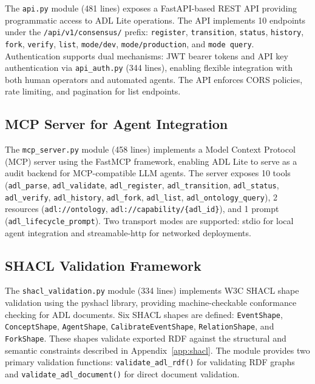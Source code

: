 The \texttt{api.py} module (481 lines) exposes a FastAPI-based REST API providing programmatic access to ADL Lite operations. The API implements 10 endpoints under the \texttt{/api/v1/consensus/} prefix: \texttt{register}, \texttt{transition}, \texttt{status}, \texttt{history}, \texttt{fork}, \texttt{verify}, \texttt{list}, \texttt{mode/dev}, \texttt{mode/production}, and \texttt{mode query}. Authentication supports dual mechanisms: JWT bearer tokens and API key authentication via \texttt{api\_auth.py} (344 lines), enabling flexible integration with both human operators and automated agents. The API enforces CORS policies, rate limiting, and pagination for list endpoints.

\subsection{MCP Server for Agent Integration}\label{app:mcp-server}

The \texttt{mcp\_server.py} module (458 lines) implements a Model Context Protocol (MCP) server using the FastMCP framework, enabling ADL Lite to serve as a audit backend for MCP-compatible LLM agents. The server exposes 10 tools (\texttt{adl\_parse}, \texttt{adl\_validate}, \texttt{adl\_register}, \texttt{adl\_transition}, \texttt{adl\_status}, \texttt{adl\_verify}, \texttt{adl\_history}, \texttt{adl\_fork}, \texttt{adl\_list}, \texttt{adl\_ontology\_query}), 2 resources (\texttt{adl://ontology}, \texttt{adl://capability/\{adl\_id\}}), and 1 prompt (\texttt{adl\_lifecycle\_prompt}). Two transport modes are supported: stdio for local agent integration and streamable-http for networked deployments.

\subsection{SHACL Validation Framework}\label{app:shacl-framework}

The \texttt{shacl\_validation.py} module (334 lines) implements W3C SHACL shape validation using the pyshacl library, providing machine-checkable conformance checking for ADL documents. Six SHACL shapes are defined: \texttt{EventShape}, \texttt{ConceptShape}, \texttt{AgentShape}, \texttt{CalibrateEventShape}, \texttt{RelationShape}, and \texttt{ForkShape}. These shapes validate exported RDF against the structural and semantic constraints described in Appendix~\ref{app:shacl}. The module provides two primary validation functions: \texttt{validate\_adl\_rdf()} for validating RDF graphs and \texttt{validate\_adl\_document()} for direct document validation.

